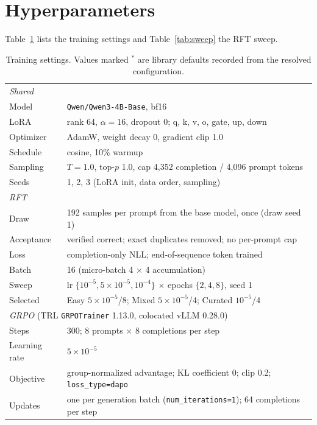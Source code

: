 \documentclass{article}
\begin{document}
\section{Hyperparameters}
\label{app:hparams}

Table~\ref{tab:hparams} lists the training settings and Table~\ref{tab:sweep} the RFT sweep.

\begin{table}[!ht]
\centering\small
\caption{Training settings. Values marked $^\ast$ are library defaults recorded from the resolved configuration.}
\label{tab:hparams}
\begin{tabular}{ll}
\toprule
\multicolumn{2}{l}{\emph{Shared}} \\
Model & \texttt{Qwen/Qwen3-4B-Base}, bf16 \\
LoRA & rank 64, $\alpha{=}16$, dropout 0; q, k, v, o, gate, up, down \\
Optimizer & AdamW, weight decay 0, gradient clip 1.0 \\
Schedule & cosine, 10\% warmup \\
Sampling & $T{=}1.0$, top-$p$ 1.0, cap 4{,}352 completion / 4{,}096 prompt tokens \\
Seeds & 1, 2, 3 (LoRA init, data order, sampling) \\
\midrule
\multicolumn{2}{l}{\emph{RFT}} \\
Draw & 192 samples per prompt from the base model, once (draw seed 1) \\
Acceptance & verified correct; exact duplicates removed; no per-prompt cap \\
Loss & completion-only NLL; end-of-sequence token trained \\
Batch & 16 (micro-batch 4 $\times$ 4 accumulation) \\
Sweep & lr $\{10^{-5}, 5{\times}10^{-5}, 10^{-4}\}$ $\times$ epochs $\{2,4,8\}$, seed 1 \\
Selected & Easy $5{\times}10^{-5}$/8; Mixed $5{\times}10^{-5}$/4; Curated $10^{-5}$/4 \\
\midrule
\multicolumn{2}{l}{\emph{GRPO} (TRL \texttt{GRPOTrainer} 1.13.0, colocated vLLM 0.28.0)} \\
Steps & 300; 8 prompts $\times$ 8 completions per step \\
Learning rate & $5{\times}10^{-5}$ \\
Objective & group-normalized advantage; KL coefficient 0; clip 0.2; \texttt{loss\_type=dapo} \\
Updates & one per generation batch (\texttt{num\_iterations=1}); 64 completions per step \\

\end{tabular}
\end{table}
\end{document}
